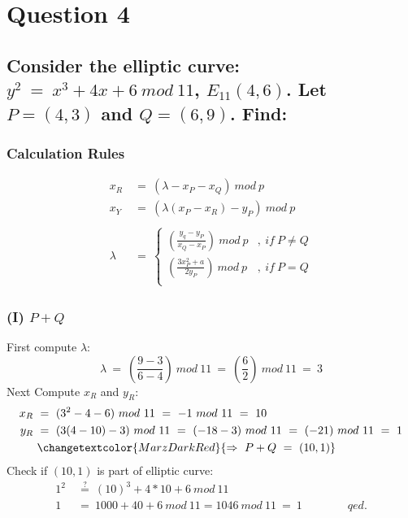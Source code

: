 \documentclass{report}
\begin{document}
	\section{Question 4}
	\startsection
		\renewcommand{\thesubsection}{\thesection.\Alph{subsection}}
		\subsection{Consider the elliptic curve: $y^2 \ = \ x^3 + 4x + 6 \ mod \ 11$, $E_{11}(4,6)$. Let $P = (4, 3)$ and $Q = (6, 9)$. Find:}
		\startsubsection
			\subsubsection{Calculation Rules}
			\vspace*{-1.5em}
			\begin{align*}
				x_R \ & = \ ( \lambda - x_P - x_Q ) \ mod \ p \\
				x_Y \ & = \ ( \lambda (x_P - x_R) - y_P ) \ mod \ p \\ \\
				\lambda \ & = \
					\begin{cases}
						\left( \frac{y_q - y_P}{x_Q - x_P} \right) \ mod \ p & , \ if \ P \neq Q \\
						\left( \frac{3x_P^2 + a}{2y_P} \right) \ mod \ p & , \ if \ P = Q \\
					\end{cases}
			\end{align*}
			\subsubsection{(I) $P + Q$}
			\startsubsection
				First compute $\lambda$:
				\[
					\lambda \ = \ \left( \frac{9-3}{6-4} \right) \ mod \ 11 \ = \ \left( \frac{6}{2} \right) \ mod \ 11 \ = \ 3
				\]
				Next Compute $x_R$ and $y_R$:
				\begin{align*}
					x_R \ & = \ (3^2 - 4 - 6) \ mod \ 11 \ = \ -1 \ mod \ 11 \ = \ 10 \\
					y_R \ & = \ (3(4 - 10) - 3) \ mod \ 11 \ = \ (-18 - 3) \ mod \ 11 \ = \ (-21) \ mod \ 11 \ = \ 1 \\
					& \changetextcolor{MarzDarkRed}{\Rightarrow \ P + Q \ = \ (10, 1)}
				\end{align*}
				Check if $(10,1)$ is part of elliptic curve:
				\begin{align*}
					1^2 \ & \stackrel{?}{=} \ (10)^3 + 4 * 10 + 6 \ mod \ 11 \\
					1 \ & = \ 1000 + 40 + 6 \ mod \ 11 = 1046 \ mod \ 11 \ = \ 1 \hspace{4em} qed.
				\end{align*}
			\closesection
\end{document}
